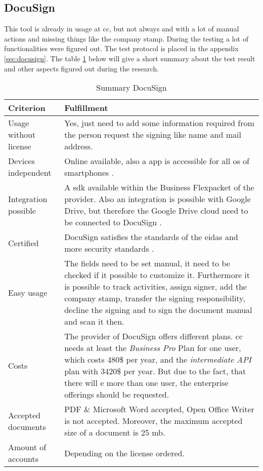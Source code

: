\subsection{DocuSign}
This tool is already in usage at \gls{cc}, but not always and with a lot of manual actions and missing things like the company stamp. During the testing a lot of functionalities were figured out. The test protocol is placed in the appendix \ref{sec:docusign}. The table \ref{tab:docusign} below will give a short summary about the test result and other aspects figured out during the research.

\begin{table}[h]
	\begin{tabular}{|p{4cm}|p{10cm}|} \hline
		Criterion & Fulfillment \\ \hline
		Usage without license & Yes, just need to add some information required from the person request the signing like name and mail address.\\ \hline
		Devices independent & Online available, also a \gls{app} is accessible for all \gls{os} of smartphones \parencite{docusign2018mobile}. \\ \hline
		Integration possible & A \gls{sdk} available within the \grqq Business Flex\grqq packet of the provider. Also an integration is possible with Google Drive, but therefore the Google Drive cloud need to be connected to DocuSign \parencite{docusign2018integration,docusign2018formats}. \\ \hline
		Certified & DocuSign satisfies the standards of the \gls{eidas} and more security standards \parencite{docusign2018certificates,docusign2018legal}. \\ \hline
		Easy usage & The fields need to be set manual, it need to be checked if it possible to customize it. Furthermore it is possible to track activities, assign signer, add the company stamp, transfer the signing responsibility, decline the signing and to sign the document manual and scan it then. \\ \hline
		Costs & The provider of DocuSign offers different plans. \Gls{cc} needs at least the \textit{Business Pro} Plan for one user, which costs 480\$ per year, and the \textit{intermediate API} plan with 3420\$ per year. But due to the fact, that there will  e more than one user, the enterprise offerings should be requested. \parencite{docusign2018api,docusign2018user} \\ \hline
		Accepted documents & PDF \& Microsoft Word accepted, Open Office Writer is not accepted. Moreover, the maximum accepted size of a document is 25 \gls{mb}. \parencite{docusign2018formats} \\ \hline
		Amount of accounts & Depending on the license ordered.\\ \hline
	\end{tabular}
	\caption{Summary DocuSign}
	\label{tab:docusign}
\end{table}

